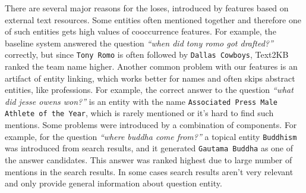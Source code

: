 There are several major reasons for the loses, introduced by features based on external text resources.
Some entities often mentioned together and therefore one of such entities gets high values of cooccurrence features.
For example, the baseline system answered the question \textit{``when did tony romo got drafted?''} correctly, but since \texttt{Tony Romo} is often followed by \texttt{Dallas Cowboys}, Text2KB ranked the team name higher.
Another common problem with our features is an artifact of entity linking, which works better for names and often skips abstract entities, like professions.
For example, the correct answer to the question \textit{``what did jesse owens won?''} is an entity with the name \texttt{Associated Press Male Athlete of the Year}, which is rarely mentioned or it's hard to find such mentions.
Some problems were introduced by a combination of components.
For example, for the question \textit{``where buddha come from?''} a topical entity \texttt{Buddhism} was introduced from search results, and it generated \texttt{Gautama Buddha} as one of the answer candidates.
This answer was ranked highest due to large number of mentions in the search results.
In some cases search results aren't very relevant and only provide general information about question entity.




